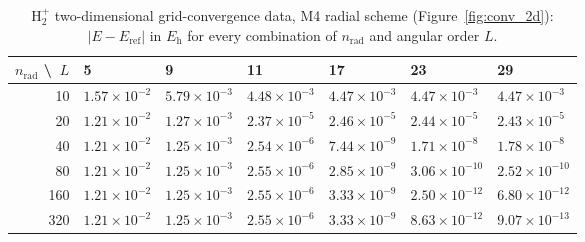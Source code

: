 \begin{table}[H]
  \centering\small
  \begin{tabular}{@{}rllllll@{}}
    \toprule
    $n_\mathrm{rad}$ \textbackslash\ $L$ & 5 & 9 & 11 & 17 & 23 & 29 \\
    \midrule
    10 & $1.57\times10^{-2}$ & $5.79\times10^{-3}$ & $4.48\times10^{-3}$ & $4.47\times10^{-3}$ & $4.47\times10^{-3}$ & $4.47\times10^{-3}$ \\
    20 & $1.21\times10^{-2}$ & $1.27\times10^{-3}$ & $2.37\times10^{-5}$ & $2.46\times10^{-5}$ & $2.44\times10^{-5}$ & $2.43\times10^{-5}$ \\
    40 & $1.21\times10^{-2}$ & $1.25\times10^{-3}$ & $2.54\times10^{-6}$ & $7.44\times10^{-9}$ & $1.71\times10^{-8}$ & $1.78\times10^{-8}$ \\
    80 & $1.21\times10^{-2}$ & $1.25\times10^{-3}$ & $2.55\times10^{-6}$ & $2.85\times10^{-9}$ & $3.06\times10^{-10}$ & $2.52\times10^{-10}$ \\
    160 & $1.21\times10^{-2}$ & $1.25\times10^{-3}$ & $2.55\times10^{-6}$ & $3.33\times10^{-9}$ & $2.50\times10^{-12}$ & $6.80\times10^{-12}$ \\
    320 & $1.21\times10^{-2}$ & $1.25\times10^{-3}$ & $2.55\times10^{-6}$ & $3.33\times10^{-9}$ & $8.63\times10^{-12}$ & $9.07\times10^{-13}$ \\
    \bottomrule
  \end{tabular}
  \caption{H$_2^+$ two-dimensional grid-convergence data, M4 radial scheme (Figure~\ref{fig:conv_2d}): $|E-E_\mathrm{ref}|$ in $E_\mathrm{h}$ for every combination of $n_\mathrm{rad}$ and angular order $L$.}
  \label{tab:data_2d_m4}
\end{table}
